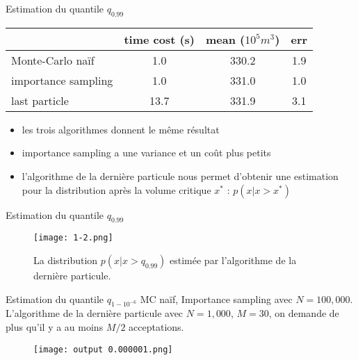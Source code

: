 \documentclass{beamer}
\begin{document}
\begin{frame}{Estimation du quantile $q_{0.99}$}
\begin{table}[h!]
    \centering
    \begin{tabular}{|l|c|c|c|}
        \hline
        & \textbf{time cost (s)} & \textbf{mean ($10^5m^3$)} & \textbf{err} \\
        \hline
        Monte-Carlo naïf       &      1.0         &       330.2       &     1.9       \\
        \hline
        importance sampling   &      1.0         &        331.0      &     1.0       \\
        \hline
        last particle         &       13.7        &      331.9        &      3.1      \\
        \hline
    \end{tabular}
\end{table}
\begin{itemize}
    \item les trois algorithmes donnent le même résultat
    \item importance sampling a une variance et un coût plus petits
    \item l'algorithme de la dernière particule nous permet d'obtenir une estimation pour la distribution après la volume critique $x^\ast$ : $p(x|x>x^\ast)$
\end{itemize}
\end{frame}

\begin{frame}{Estimation du quantile $q_{0.99}$}
    \begin{figure}
        \centering
        \texttt{[image: 1-2.png]}
        \caption{La distribution $p(x|x>q_{0.99})$ estimée par l'algorithme de la dernière particule.}
    \end{figure}
\end{frame}

\begin{frame}{Estimation du quantile $q_{1-10^{-6}}$}
MC naïf, Importance sampling avec $N=100,000$.\\
L'algorithme de la dernière particule avec $N=1,000$, $M=30$, on demande de plus qu'il y a au moins $M/2$ acceptations.
    \begin{figure}
        \centering
        \texttt{[image: output 0.000001.png]}
    \end{figure}
\end{frame}
\end{document}
